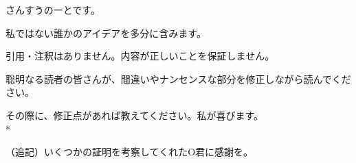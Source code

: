 
さんすうのーとです。

私ではない誰かのアイデアを多分に含みます。

引用・注釈はありません。内容が正しいことを保証しません。

聡明なる読者の皆さんが、間違いやナンセンスな部分を修正しながら読んでください。

その際に、修正点があれば教えてください。私が喜びます。\\*

（追記）いくつかの証明を考察してくれたO君に感謝を。